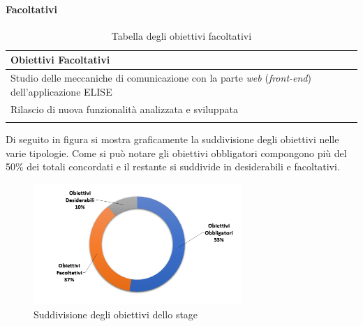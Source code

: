 	\paragraph{Facoltativi}

		\begin{center}
		  \bgroup
		  \def\arraystretch{1.4}
		   \setlength\arrayrulewidth{0.6pt}
		   \begin{longtable}{ | p{11cm} |} \hline
		   
		    \cellcolor[gray]{0.9} \textbf{Obiettivi Facoltativi} \\ \hline

			Studio delle meccaniche di comunicazione con la parte \textit{web} (\textit{front-end}) dell'applicazione ELISE \\ \hline
			Rilascio di nuova funzionalità analizzata e sviluppata \\ \hline

			
			\caption{Tabella degli obiettivi facoltativi}
			
		    \end{longtable}
		  \egroup
		\end{center}	
	

	Di seguito in figura si mostra graficamente la suddivisione degli obiettivi nelle varie tipologie. Come si può notare gli obiettivi obbligatori compongono più del 50\% dei totali concordati e il restante si suddivide in desiderabili e facoltativi.\\
	
	\begin{figure}[H]
		\centering
	   	\includegraphics[width=0.7\textwidth]{immagini/Percentuale_Obiettivi}
	   	\caption{Suddivisione degli obiettivi dello stage}
	\end{figure}

